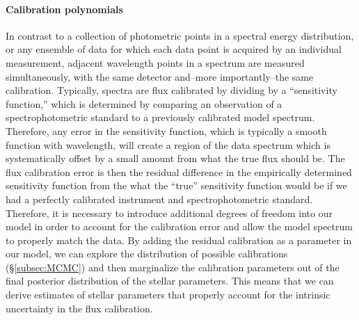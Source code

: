 \documentclass[preprint]{aastex} %
\begin{document}
\paragraph{Calibration polynomials} In contrast to a collection of photometric points in a spectral energy distribution, or any ensemble of data for which each data point is acquired by an individual measurement, adjacent wavelength points in a spectrum are measured simultaneously, with the same detector and--more importantly--the same calibration. Typically, spectra are flux calibrated by dividing by a ``sensitivity function,'' which is determined by comparing an observation of a spectrophotometric standard to a previously calibrated model spectrum. Therefore, any error in the sensitivity function, which is typically a smooth function with wavelength, will create a region of the data spectrum which is systematically offset by a small amount from what the true flux should be. The flux calibration error is then the residual difference in the empirically determined sensitivity function from the what the ``true'' sensitivity function would be if we had a perfectly calibrated instrument and spectrophotometric standard. Therefore, it is necessary to introduce additional degrees of freedom into our model in order to account for the calibration error and allow the model spectrum to properly match the data. By adding the residual calibration as a parameter in our model, we can explore the distribution of possible calibrations (\S\ref{subsec:MCMC}) and then marginalize the calibration parameters out of the final posterior distribution of the stellar parameters. This means that we can derive estimates of stellar parameters that properly account for the intrinsic uncertainty in the flux calibration.
\end{document}
